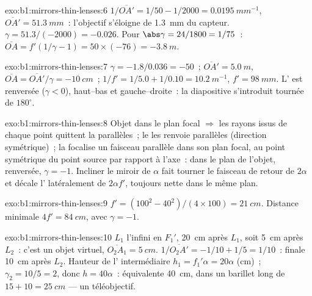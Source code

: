 \begin{solution}{exo:b1:mirrors-thin-lenses:6}
$1/\overline{OA'} = 1/50 - 1/2000 = \qty{0.0195}{mm^{-1}}$,
$\overline{OA'} = \qty{51.3}{mm}$~: l'objectif s'éloigne de \qty{1.3}{mm}
du capteur. $\gamma = 51.3/(-2000) = -0.026$. Pour $\abs\gamma = 24/1800
= 1/75$~: $\overline{OA} = f'(1/\gamma - 1) = 50 \times (-76) =
\qty{-3.8}{m}$.
\end{solution}

\begin{solution}{exo:b1:mirrors-thin-lenses:7}
$\gamma = -1.8/0.036 = -50$~; $\overline{OA'} = \qty{5.0}{m}$,
$\overline{OA} = \overline{OA'}/\gamma = \qty{-10}{cm}$~;
$1/f' = 1/5.0 + 1/0.10 = \qty{10.2}{m^{-1}}$, $f' = \qty{98}{mm}$.
L' est renversée ($\gamma < 0$), haut--bas et gauche--droite~: la
diapositive s'introduit tournée de $180^\circ$.
\end{solution}

\begin{solution}{exo:b1:mirrors-thin-lenses:8}
Objet dans le plan focal $\Rightarrow$ les rayons issus de chaque point
quittent la  parallèles~; le  les renvoie parallèles
(direction symétrique)~; la  focalise un faisceau parallèle dans
son plan focal, au point symétrique du point source par rapport à
l'axe~:  dans le plan de l'objet, renversée, $\gamma = -1$. Incliner
le miroir de $\alpha$ fait tourner le faisceau de retour de $2\alpha$ et
décale l' latéralement de $2\alpha f'$, toujours nette dans le même plan.
\end{solution}

\begin{solution}{exo:b1:mirrors-thin-lenses:9}
$f' = (100^2 - 40^2)/(4 \times 100) = \qty{21}{cm}$. Distance minimale
$4f' = \qty{84}{cm}$, avec $\gamma = -1$.
\end{solution}

\begin{solution}{exo:b1:mirrors-thin-lenses:10}
$L_1$  l'infini en $F_1'$, \qty{20}{cm} après $L_1$, soit \qty{5}{cm}
après $L_2$~: c'est un objet virtuel, $\overline{O_2A_1} = \qty{+5}{cm}$.
$1/\overline{O_2A'} = -1/10 + 1/5 = 1/10$~:  finale \qty{10}{cm}
après $L_2$. Hauteur de l' intermédiaire $h_1 = f_1'\alpha = 20\alpha$ (cm)~;
$\gamma_2 = 10/5 = 2$, donc $h = 40\alpha$~:  équivalente
\qty{40}{cm}, dans un barillet long de $15 + 10 = \qty{25}{cm}$ --- un téléobjectif.
\end{solution}

